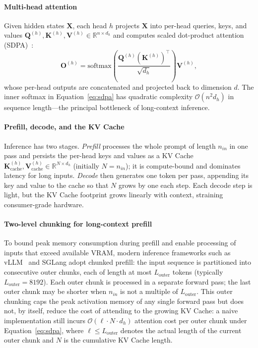 \documentclass[10pt,conference]{IEEEtran}
\begin{document}
\paragraph{Multi-head attention}
Given hidden states $\mathbf{X}$, each head $h$ projects $\mathbf{X}$ into
per-head queries, keys, and values
$\mathbf{Q}^{(h)}, \mathbf{K}^{(h)}, \mathbf{V}^{(h)} \in \mathbb{R}^{n \times d_h}$
and computes scaled dot-product attention (SDPA)~\cite{vaswani2017attention}:
\begin{equation}
    \mathbf{O}^{(h)} = \text{softmax}\!\left(\frac{\mathbf{Q}^{(h)} (\mathbf{K}^{(h)})^\top}{\sqrt{d_h}}\right) \mathbf{V}^{(h)},
    \label{eq:sdpa}
\end{equation}
whose per-head outputs are concatenated and projected back to dimension
$d$. The inner softmax in Equation~\eqref{eq:sdpa} has quadratic
complexity $\mathcal{O}(n^2 d_h)$ in sequence length---the principal
bottleneck of long-context inference.

\paragraph{Prefill, decode, and the KV Cache}
Inference has two stages. \emph{Prefill} processes the whole prompt of
length $n_{in}$ in one pass and persists the per-head keys and values as a
KV Cache
$\mathbf{K}^{(h)}_{\text{cache}}, \mathbf{V}^{(h)}_{\text{cache}} \in \mathbb{R}^{N \times d_h}$
(initially $N = n_{in}$); it is compute-bound and dominates latency for
long inputs. \emph{Decode} then generates one token per pass, appending
its key and value to the cache so that $N$ grows by one each step. Each
decode step is light, but the KV Cache footprint grows linearly with
context, straining consumer-grade hardware.

\paragraph{Two-level chunking for long-context prefill}
To bound peak memory consumption during prefill and enable processing 
of inputs that exceed available VRAM, modern inference frameworks such 
as vLLM~\cite{kwon2023efficient} and SGLang adopt chunked prefill: 
the input sequence is partitioned into consecutive outer chunks, each 
of length at most $L_{\text{outer}}$ tokens (typically 
$L_{\text{outer}} = 8192$). Each outer chunk is processed in a separate 
forward pass; the last outer chunk may be shorter when $n_{in}$ is not 
a multiple of $L_{\text{outer}}$. This outer chunking caps the peak 
activation memory of any single forward pass but does not, by itself, 
reduce the cost of attending to the growing KV Cache: a naive 
implementation still incurs $\mathcal{O}(\ell \cdot N \cdot d_h)$ 
attention cost per outer chunk under Equation~\eqref{eq:sdpa}, where 
$\ell \leq L_{\text{outer}}$ denotes the actual length of the current 
outer chunk and $N$ is the cumulative KV Cache length.
\end{document}
